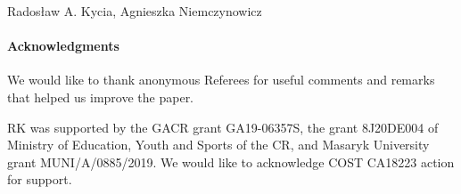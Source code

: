 \begin{artengenv2auth}{Rados\l aw A. Kycia, Agnieszka Niemczynowicz}

\paragraph{Acknowledgments} We would like to thank anonymous Referees for useful comments and remarks that helped us improve the paper.

RK was supported by the GACR grant GA19-06357S, the grant 8J20DE004 of Ministry of Education, Youth and Sports of the CR, and Masaryk University grant MUNI/A/0885/2019. We would like to acknowledge COST CA18223 action for support.

 
 \end{artengenv2auth}

